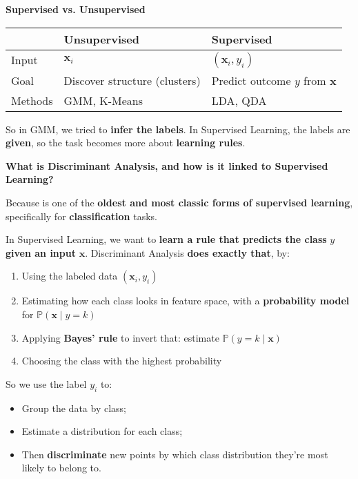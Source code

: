 \highspace
\begin{flushleft}
    \textcolor{Green3}{ \textbf{Supervised vs. Unsupervised}}
\end{flushleft}
\begin{table}[!htp]
    \centering
    \begin{tabular}{@{} l | l | l @{}}
        \toprule
                    & \textbf{Unsupervised}         & \textbf{Supervised}   \\
        \midrule
        Input       & $\mathbf{x}_{i}$              & $\left(\mathbf{x}_{i}, y_{i}\right)$  \\ [.3em]
        Goal        & Discover structure (clusters) & Predict outcome $y$ from $\mathbf{x}$ \\ [.3em]
        Methods     & GMM, K-Means                  & LDA, QDA                              \\
        \bottomrule
    \end{tabular}
\end{table}

\noindent
So in GMM, we tried to \textbf{infer the labels}. In Supervised Learning, the labels are \textbf{given}, so the task becomes more about \textbf{learning rules}.

\highspace
\begin{flushleft}
    \textcolor{Green3}{ \textbf{What is Discriminant Analysis, and how is it linked to Supervised Learning?}}
\end{flushleft}
Because  is one of the \textbf{oldest and most classic forms of supervised learning}, specifically for \textbf{classification} tasks.

\highspace
In Supervised Learning, we want to \textbf{learn a rule that predicts the class} $y$ \textbf{given an input} $\mathbf{x}$. Discriminant Analysis \textbf{does exactly that}, by:
\begin{enumerate}
    \item Using the labeled data $(\mathbf{x}_i, y_i)$
    \item Estimating how each class looks in feature space, with a \textbf{probability model} for $\mathbb{P}(\mathbf{x} \mid y = k)$
    \item Applying \textbf{Bayes' rule} to invert that: estimate $\mathbb{P}(y = k \mid \mathbf{x})$
    \item Choosing the class with the highest probability
\end{enumerate}
So we use the label $y_{i}$ to:
\begin{itemize}
    \item Group the data by class;
    \item Estimate a distribution for each class;
    \item Then \textbf{discriminate} new points by which class distribution they're most likely to belong to.
\end{itemize}

